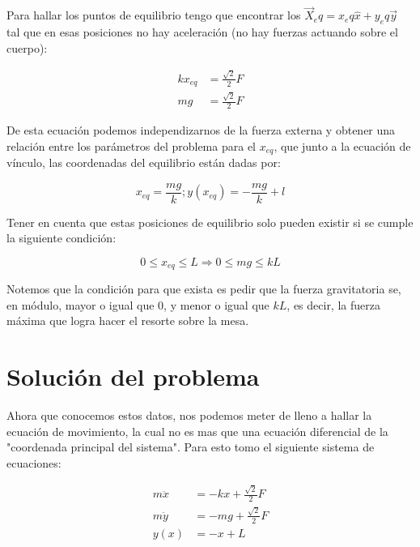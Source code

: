 \documentclass{article}
\begin{document}
Para hallar los puntos de equilibrio tengo que encontrar los $\vec{X}_eq = x_eq \hat{x} + y_eq \vec{y}$ tal que en esas posiciones no hay aceleración (no hay fuerzas actuando sobre el cuerpo):

\begin{equation}
\begin{split}
    kx_{eq} &= \frac{\sqrt{2}}{2}F \\
    mg &= \frac{\sqrt{2}}{2}F
\end{split}
\end{equation}

De esta ecuación podemos independizarnos de la fuerza externa y obtener una relación entre los parámetros del problema para el $x_{eq}$, que junto a la ecuación de vínculo, las coordenadas del equilibrio están dadas por:

\begin{equation}
    x_{eq} = \frac{mg}{k} ; y(x_{eq}) = -\frac{mg}{k} + l
\end{equation}

Tener en cuenta que estas posiciones de equilibrio solo pueden existir si se cumple la siguiente condición:

\begin{equation}
    0 \leq x_{eq} \leq L \Rightarrow 0 \leq mg \leq kL
\end{equation}

Notemos que la condición para que exista es pedir que la fuerza gravitatoria se, en módulo, mayor o igual que $0$, y menor o igual que $kL$, es decir, la fuerza máxima que logra hacer el resorte sobre la mesa.

\section{Solución del problema}
Ahora que conocemos estos datos, nos podemos meter de lleno a hallar la ecuación de movimiento, la cual no es mas que una ecuación diferencial de la "coordenada principal del sistema". Para esto tomo el siguiente sistema de ecuaciones:

\begin{equation}
\begin{split}
    m\ddot{x} &= -kx + \frac{\sqrt{2}}{2}F \\
    m\ddot{y} &= -mg + \frac{\sqrt{2}}{2}F \\
    y(x) &= -x + L
\end{split}
\end{equation}
\end{document}
